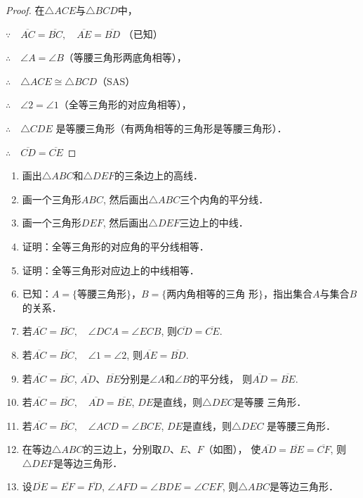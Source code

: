 \begin{proof}
在$\triangle ACE$与$\triangle BCD$中，

$\because\quad \overline{AC}=\overline{BC},\quad \overline{AE}=\overline{BD}$ （已知）

$\therefore\quad \angle A=\angle B$（等腰三角形两底角相等），

$\therefore\quad \triangle ACE\cong \triangle BCD$（SAS）

$\therefore\quad \angle 2=\angle 1$（全等三角形的对应角相等），

$\therefore\quad \triangle CDE$ 是等腰三角形（有两角相等的三角形是等腰三角形）．

$\therefore\quad \overline{CD}=\overline{CE}$
\end{proof}

\begin{ex}
\begin{enumerate}
    \item 画出$\triangle ABC$和$\triangle DEF$的三条边上的高线．
    \item 画一个三角形$ABC$, 然后画出$\triangle ABC$三个内角的平分线．
    \item 画一个三角形$DEF$, 然后画出$\triangle DEF$三边上的中线．
    \item 证明：全等三角形的对应角的平分线相等．
    \item 证明：全等三角形对应边上的中线相等．
    \item 已知：$A=\{\text{等腰三角形}\}$，$B=\{\text{两内角相等的三角
    形}\}$，指出集合$A$与集合$B$的关系．
    \item 若$\overline{AC}=\overline{BC},\quad \angle DCA=\angle ECB$, 则$\overline{CD}=\overline{CE}$.
    \item 若$\overline{AC}=\overline{BC},\quad \angle 1=\angle 2$, 则$\overline{AE}=\overline{BD}$.
    \item 若$\overline{AC}=\overline{BC}$, $\overline{AD}$、$\overline{BE}$分别是$\angle A$和$\angle B$的平分线，
    则$\overline{AD}=\overline{BE}$.
    \item 若$\overline{AC}=\overline{BC},\quad \overline{AD}=\overline{BE}$, $DE$是直线，则$\triangle DEC$是等腰
三角形．
\item 若$\overline{AC}=\overline{BC},\quad \angle ACD=\angle BCE$, $DE$是直线，则$\triangle DEC$
是等腰三角形．
\item 在等边$\triangle ABC$的三边上，分别取$D$、$E$、$F$（如图），
使$\overline{AD}=\overline{BE}=\overline{CF}$, 则$\triangle DEF$是等边三角形．
\item 设$\overline{DE}=\overline{EF}=\overline{FD}$, $\angle AFD=\angle BDE=\angle CEF$, 
则$\triangle ABC$是等边三角形．
\end{enumerate}
\end{ex}

